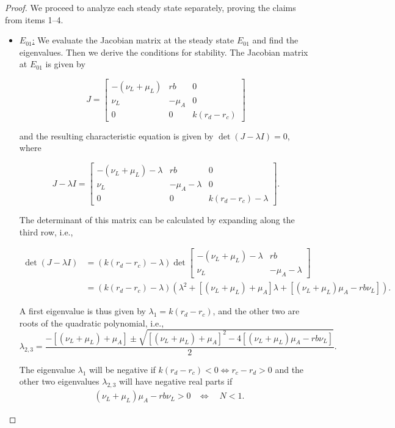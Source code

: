 \documentclass{article}
\theoremstyle{remark}
\theoremstyle{custom} %
\begin{document}
\begin{proof}

 We proceed to analyze each steady state separately, proving the claims from items 1--4. 


 \begin{itemize}

 \item \underline{$E_{01}$:} We evaluate the Jacobian matrix at the steady state $E_{01}$ and find the eigenvalues. Then we derive the conditions for stability. The Jacobian matrix at $E_{01}$ is given by

\[
J = \begin{bmatrix}
-(\nu_L + \mu_L) & r b & 0 \\
\nu_L & -\mu_A & 0 \\
0 & 0 & k(r_d - r_c)
\end{bmatrix}
\]

and the resulting characteristic equation is given by \(\det(J - \lambda I) = 0\), where

\[
J - \lambda I = \begin{bmatrix}
-(\nu_L + \mu_L) - \lambda & r b & 0 \\
\nu_L & -\mu_A - \lambda & 0 \\
0 & 0 & k(r_d - r_c) - \lambda
\end{bmatrix}.
\]

The determinant of this matrix can be calculated by expanding along the third row, i.e.,


$$
\begin{aligned}
\operatorname{det}(J-\lambda I) & =(k(r_d - r_c)-\lambda)  \operatorname{det}\left[\begin{array}{cc}
-\left(\nu_L+\mu_L\right)-\lambda & r b \\
\nu_L & -\mu_A-\lambda
\end{array}\right] \\
& =(k(r_d - r_c)-\lambda)\left(\lambda^2+\left[\left(\nu_L+\mu_L\right)+\mu_A\right] \lambda+\left[\left(\nu_L+\mu_L\right) \mu_A-r b \nu_L\right]\right).
\end{aligned}
$$

A first eigenvalue is thus given by \(\lambda_1= k(r_d - r_c)\), and the other two are roots of the quadratic polynomial, i.e., 
$$\lambda_{2,3}=\frac{-\left[(\nu_L+\mu_L)+\mu_A\right] \pm \sqrt{\left[(\nu_L+\mu_L)+\mu_A\right]^2 - 4\left[(\nu_L+\mu_L)\mu_A - r b \nu_L\right]}}{2}.$$


The eigenvalue $\lambda_1$ will be negative if $k(r_d - r_c) < 0 \Leftrightarrow r_c - r_d >0$ and the other two eigenvalues \(\lambda_{2,3}\) will have negative real parts if $$
\begin{aligned}
& \left(\nu_L+\mu_L\right) \mu_A-r b \nu_L>0 
& \Leftrightarrow\quad {N}<1.
\end{aligned}
$$


\end{itemize}
\end{proof}
\end{document}
